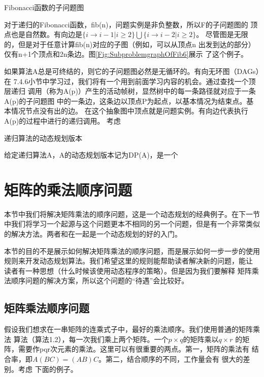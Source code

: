 \begin{example}
Fibonacci函数的子问题图

对于递归的Fibonacci函数，fib(n)，问题实例是非负整数，所以F的子问题图的
顶点也是自然数。有向边是$\{i \rightarrow i-1 | i \geq 2\}\bigcup \{i \rightarrow i-2 |i \geq 2\}$。
尽管图是无限的，但是对于任意计算fib(n)对应的子图（例如，可以从顶点n
出发到达的部分）仅有n+1个顶点和2n条边。图\ref{Fig:SubproblemgraphOfFib6}展示
了这个例子。
\end{example}

如果算法A总是可终结的，则它的子问题图必然是无循环的。有向无环图（DAGs）在
7.4.6小节中学习过，我们将有一个用到前面学习内容的机会。通过查找一个顶层递归
调用（称为A(p)）产生的活动帧树，显然树中的每一条路径就对应于一条A(p)的子问题图
中的一条边，这条边以顶点P为起点，以基本情况为结束点。基本情况节点没有出的边。
在这个抽象图中顶点就是问题实例。有向边代表执行A(p)的过程中进行的递归调用。
考虑
\begin{definition}
递归算法的动态规划版本

给定递归算法A，A的动态规划版本记为DP(A)，是一个
\end{definition}


\section{矩阵的乘法顺序问题}
本节中我们将解决矩阵乘法的顺序问题，这是一个动态规划的经典例子。在下一节
中我们将学习一个起源与这个问题更本不相同的另一个问题，但是有一个非常类似
的解决方法。两者和在一起是一个动态规划的好的入门。

本节的目的不是展示如何解决矩阵乘法的顺序问题，而是展示如何一步一步的使用
规则来开发动态规划算法。我们希望这里的规则能帮助读者解决新的问题，能让
读者有一种思想（什么时候该使用动态程序的策略）。但是因为我们要解释
矩阵乘法顺序问题的解决方案，所以这个问题的“待遇”会比较好。

\subsection{矩阵乘法顺序问题}
假设我们想求在一串矩阵的连乘式子中，最好的乘法顺序。我们使用普通的矩阵乘法
算法（算法1.2），每一次我们乘上两个矩阵。一个$p \times q$的矩阵乘以$q\times r$
的矩阵，需要作pqr次元素的乘法。这里可以有很重要的两点。第一，矩阵的乘法有
结合率，即$A(BC)=(AB)C$。第二，结合顺序的不同，工作量会有 很大的差别。考虑
下面的例子。

